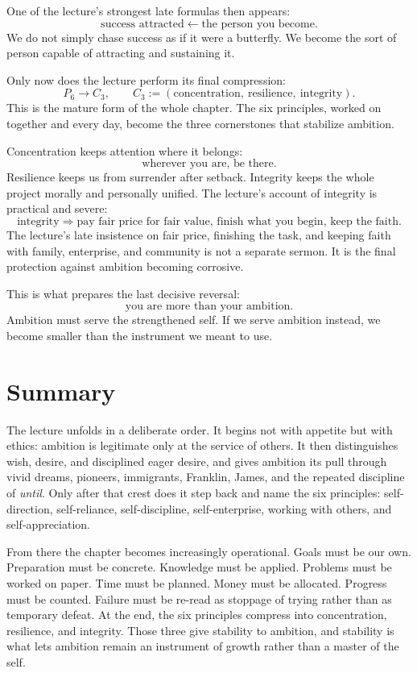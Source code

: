 One of the lecture's strongest late formulas then appears:
\begin{equation}
\text{success attracted} \leftarrow \text{the person you become}.
\end{equation}
We do not simply chase success as if it were a butterfly. We become the sort of person capable of attracting and sustaining it.

Only now does the lecture perform its final compression:
\begin{equation}
P_6 \to C_3, \qquad
C_3 := (\text{concentration},\ \text{resilience},\ \text{integrity}).
\end{equation}
This is the mature form of the whole chapter. The six principles, worked on together and every day, become the three cornerstones that stabilize ambition.

Concentration keeps attention where it belongs:
\[
\text{wherever you are, be there}.
\]
Resilience keeps us from surrender after setback. Integrity keeps the whole project morally and personally unified. The lecture's account of integrity is practical and severe:
\begin{equation}
\text{integrity} \Rightarrow \text{pay fair price for fair value, finish what you begin, keep the faith}.
\end{equation}
The lecture's late insistence on fair price, finishing the task, and keeping faith with family, enterprise, and community is not a separate sermon. It is the final protection against ambition becoming corrosive.

This is what prepares the last decisive reversal:
\[
\text{you are more than your ambition}.
\]
Ambition must serve the strengthened self. If we serve ambition instead, we become smaller than the instrument we meant to use.

\section{Summary}

The lecture unfolds in a deliberate order. It begins not with appetite but with ethics: ambition is legitimate only at the service of others. It then distinguishes wish, desire, and disciplined eager desire, and gives ambition its pull through vivid dreams, pioneers, immigrants, Franklin, James, and the repeated discipline of \emph{until}. Only after that crest does it step back and name the six principles: self-direction, self-reliance, self-discipline, self-enterprise, working with others, and self-appreciation.

From there the chapter becomes increasingly operational. Goals must be our own. Preparation must be concrete. Knowledge must be applied. Problems must be worked on paper. Time must be planned. Money must be allocated. Progress must be counted. Failure must be re-read as stoppage of trying rather than as temporary defeat. At the end, the six principles compress into concentration, resilience, and integrity. Those three give stability to ambition, and stability is what lets ambition remain an instrument of growth rather than a master of the self.
